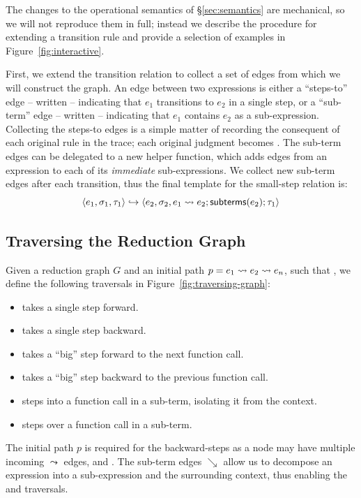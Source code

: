 %
The changes to the operational semantics of \S\ref{sec:semantics} are
mechanical, so we will not reproduce them in full; instead we describe
the procedure for extending a transition rule and provide a selection of
examples in Figure~\ref{fig:interactive}.

First, we extend the transition relation to collect a set of edges from
which we will construct the graph.
%
An edge between two expressions is either a ``steps-to'' edge -- written
 -- indicating that $e_1$ transitions to $e_2$ in a
single step, or a ``sub-term'' edge -- written  --
indicating that $e_1$ contains $e_2$ as a sub-expression.
%
Collecting the steps-to edges is a simple matter of recording the
consequent of each original rule in the trace; each original judgment
 becomes
.
%
The sub-term edges can be delegated to a new \subtermssym helper
function, which adds edges from an expression to each of its
\emph{immediate} sub-expressions.
%
We collect new sub-term edges after each transition, thus the final
template for the small-step relation is:
\[
\langle e_1, \sigma_1, \tau_1 \rangle \hookrightarrow \langle e_2, \sigma_2, e_1 \leadsto e_2; \mathsf{subterms}(e_2); \tau_1 \rangle
\]

\subsection{Traversing the Reduction Graph}
\label{sec:traversing-graph}
Given a reduction graph $G$ and an initial path
$p = e_1 \leadsto e_2 \leadsto e_n$, such that
, we define the following
traversals in Figure~\ref{fig:traversing-graph}:
%
\begin{itemize}
\item \stepforwardsym takes a single step forward.
\item \stepbackwardsym takes a single step backward.
\item \jumpforwardsym takes a ``big'' step forward to the next function call.
\item \jumpbackwardsym takes a ``big'' step backward to the previous function call.
\item \stepintosym steps into a function call in a sub-term, isolating it from the context.
\item \stepoversym steps over a function call in a sub-term.
\end{itemize}
%
The initial path $p$ is required for the backward-steps as a node may
have multiple incoming $\leadsto$ edges, \eg
{} and .
%
The sub-term edges $\searrow$ allow us to decompose an expression into a
sub-expression and the surrounding context, thus enabling the \stepintosym
and \stepoversym traversals.
%


